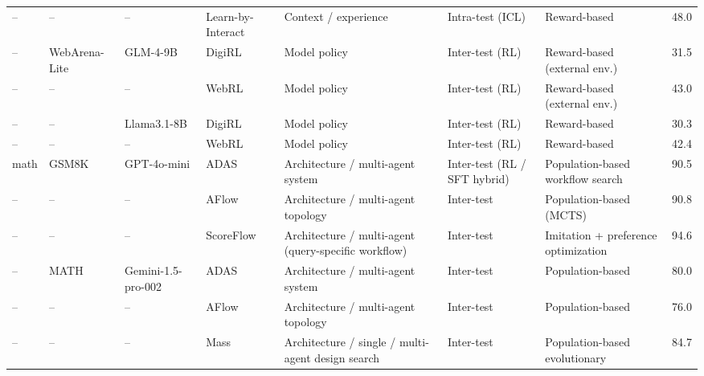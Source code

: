 \documentclass[10pt]{article} %
\begin{document}
\begin{table}[t]
\begin{tabularx}{\textwidth}{l l p{2.0cm} p{2.4cm} X X X c}
-- & -- & -- & Learn-by-Interact \citep{su2025learnbyinteractdatacentricframeworkselfadaptive}
& Context / experience
& Intra-test (ICL)
& Reward-based
& 48.0 \\

-- & WebArena-Lite & GLM-4-9B & DigiRL \citep{bai2024digirl}
& Model policy
& Inter-test (RL)
& Reward-based (external env.)
& 31.5 \\

-- & -- & -- & WebRL \citep{qi2024webrl}
& Model policy
& Inter-test (RL)
& Reward-based (external env.)
& 43.0 \\

-- & -- & Llama3.1-8B & DigiRL \citep{bai2024digirl}
& Model policy
& Inter-test (RL)
& Reward-based
& 30.3 \\

-- & -- & -- & WebRL \citep{qi2024webrl}
& Model policy
& Inter-test (RL)
& Reward-based
& 42.4 \\
\midrule

math & GSM8K & GPT-4o-mini & ADAS \citep{hu2024automated}
& Architecture / multi-agent system
& Inter-test (RL / SFT hybrid)
& Population-based workflow search
& 90.5 \\

-- & -- & -- & AFlow \citep{zhang2024aflow}
& Architecture / multi-agent topology
& Inter-test
& Population-based (MCTS)
& 90.8 \\

-- & -- & -- & ScoreFlow \citep{wang2025scoreflow}
& Architecture / multi-agent (query-specific workflow)
& Inter-test
& Imitation + preference optimization
& 94.6 \\

-- & MATH & Gemini-1.5-pro-002 & ADAS \citep{hu2024automated}
& Architecture / multi-agent system
& Inter-test
& Population-based
& 80.0 \\

-- & -- & -- & AFlow \citep{zhang2024aflow}
& Architecture / multi-agent topology
& Inter-test
& Population-based
& 76.0 \\

-- & -- & -- & Mass \citep{zhang2025maas}
& Architecture / single / multi-agent design search
& Inter-test
& Population-based evolutionary
& 84.7 \\
\bottomrule

\end{tabularx}
\end{table}

\end{document}
